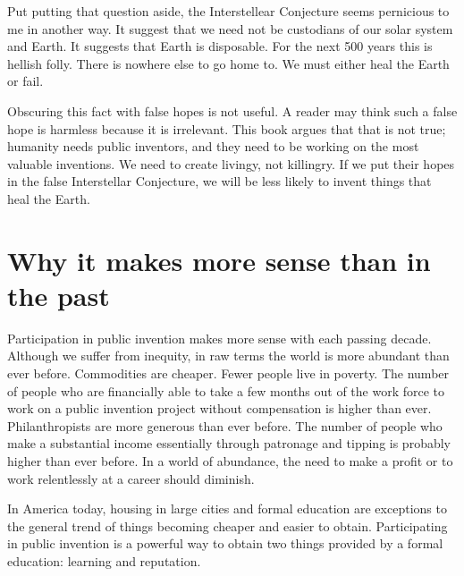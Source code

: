 \documentclass[
	fontsize=10pt, %
	twoside=false, %
	secnumdepth=1, %
]{kaobook}
\begin{document}
Put putting that question aside, the Interstellear Conjecture seems pernicious to me in another way.
It suggest that we need not be custodians of our solar system and Earth. It suggests that Earth
is disposable. For the next 500 years this is hellish folly. There is nowhere else to go home to.
We must either heal the Earth or fail.

Obscuring this fact with false hopes is not useful.
A reader may think such a false hope is harmless because it is irrelevant.
This book argues that that is not true; humanity needs public inventors, and they need to be working
on the most valuable inventions.
We need to create livingy, not killingry.
If we put their hopes in the false Interstellar Conjecture, we will be less likely to invent
things that heal the Earth.

\chapter{Why it makes more sense than in the past}

Participation in public invention makes more sense with
each passing decade.
Although we suffer from inequity, in raw terms the world
is more abundant than ever before.
Commodities are cheaper.
Fewer people live in poverty.
The number of people who are financially able to take
a few months out of the work force to work on a public invention
project without compensation is higher than ever.
Philanthropists are more generous than ever before.
The number of people who make a substantial income
essentially through patronage and tipping is probably
higher than ever before.
In a world of abundance, the need to make a profit
or to work relentlessly at a career should
diminish.

In America today, housing in large cities
and formal education are exceptions
to the general trend of things becoming cheaper and easier to obtain.
Participating in public invention is a powerful way to
obtain two things provided by a formal education:
learning and reputation.
\end{document}
